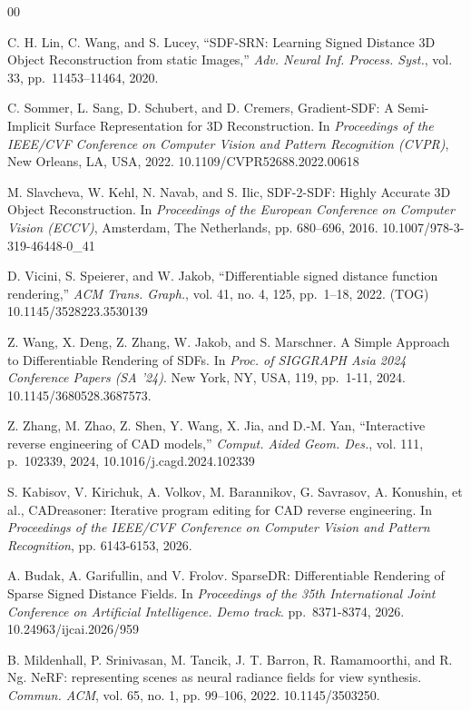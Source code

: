 \documentclass{ieeeaccess}
\begin{document}
\begin{thebibliography}{00}

C. H. Lin, C. Wang, and S. Lucey, ``SDF-SRN: Learning Signed Distance 3D Object Reconstruction from static Images,'' \textit{Adv. Neural Inf. Process. Syst.}, vol. 33, pp.~11453--11464, 2020.

C. Sommer, L. Sang, D. Schubert, and D. Cremers, Gradient-SDF: A Semi-Implicit Surface Representation for 3D Reconstruction. In \textit{Proceedings of the IEEE/CVF Conference on Computer Vision and Pattern Recognition (CVPR)}, New Orleans, LA, USA, 2022. 10.1109/CVPR52688.2022.00618

M. Slavcheva, W. Kehl, N. Navab, and S. Ilic, SDF-2-SDF: Highly Accurate 3D Object Reconstruction. In \textit{Proceedings of the European Conference on Computer Vision (ECCV)}, Amsterdam, The Netherlands, pp. 680--696, 2016. 10.1007/978-3-319-46448-0\_41

D. Vicini, S. Speierer, and W. Jakob, ``Differentiable signed distance function rendering,'' \textit{ACM Trans. Graph.}, vol. 41, no. 4, 125, pp.~1--18, 2022. (TOG) 10.1145/3528223.3530139

Z. Wang, X. Deng, Z. Zhang, W. Jakob, and S. Marschner. A Simple Approach to Differentiable Rendering of SDFs. In \textit{Proc. of SIGGRAPH Asia 2024 Conference Papers (SA '24)}. New York, NY, USA, 119, \mbox{pp. 1-11,} 2024. 10.1145/3680528.3687573.

Z. Zhang, M. Zhao, Z. Shen, Y. Wang, X. Jia, and D.-M. Yan, ``Interactive reverse engineering of CAD models,'' \textit{Comput. Aided Geom. Des.}, vol. 111, p.~102339, 2024, 10.1016/j.cagd.2024.102339

S. Kabisov, V. Kirichuk, A. Volkov, M. Barannikov, G. Savrasov, A. Konushin, et al., CADreasoner: Iterative program editing for CAD reverse engineering. In \textit{Proceedings of the IEEE/CVF Conference on Computer Vision and Pattern Recognition}, pp. 6143-6153, 2026.

A. Budak, A. Garifullin, and V. Frolov. SparseDR: Differentiable Rendering of Sparse Signed Distance Fields. In \textit{Proceedings of the 35th International Joint Conference on Artificial Intelligence. Demo track}. \mbox{pp.~8371-8374,} 2026. 10.24963/ijcai.2026/959

B. Mildenhall, P. Srinivasan, M. Tancik, J. T. Barron, R. Ramamoorthi, and R. Ng. NeRF: representing scenes as neural radiance fields for view synthesis. \textit{Commun. ACM}, vol. 65, no. 1, pp. 99--106, 2022. 10.1145/3503250.


\end{thebibliography}
\end{document}
